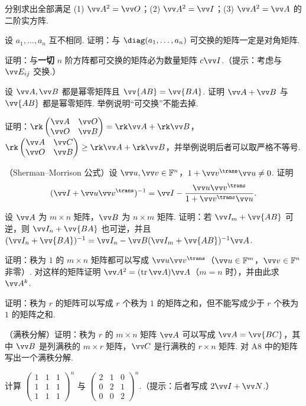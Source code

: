 {		\Bgroup
		\begin{exB}
			\item\label{ex:mat:B1} 分别求出全部满足 (1) $\vv A^2=\vv O$；(2) $\vv A^2=\vv I$；(3) $\vv A^2=\vv A$ 的二阶实方阵.
			\item\label{ex:mat:B2} 设 $a_1,\ldots,a_n$ 互不相同. 证明：与 $\diag(a_1,\ldots,a_n)$ 可交换的矩阵一定是对角矩阵.
			\item\label{ex:mat:B3} 证明：与\textbf{一切} $n$ 阶方阵都可交换的矩阵必为数量矩阵 $c\vv I$.（提示：考虑与 $\vv E_{ij}$ 交换.）
			\item\label{ex:mat:B4} 设 $\vv A,\vv B$ 都是幂零矩阵且 $\vv{AB}=\vv{BA}$. 证明 $\vv A+\vv B$ 与 $\vv{AB}$ 都是幂零矩阵. 举例说明“可交换”不能去掉.
			\item\label{ex:mat:B5} 证明：$\rk\begin{pmatrix}\vv A&\vv O\\ \vv O&\vv B\end{pmatrix}=\rk\vv A+\rk\vv B$，$\rk\begin{pmatrix}\vv A&\vv C\\ \vv O&\vv B\end{pmatrix}\ge\rk\vv A+\rk\vv B$，并举例说明后者可以取严格不等号.
			\item\label{ex:mat:B6} （Sherman–Morrison 公式）设 $\vv u,\vv v\in\mathbb{F}^n$，$1+\vv v^\trans\vv u\ne0$. 证明
			\[(\vv I+\vv u\vv v^\trans)^{-1}=\vv I-\frac{\vv u\vv v^\trans}{1+\vv v^\trans\vv u}.\]
			\item\label{ex:mat:B7} 设 $\vv A$ 为 $m\times n$ 矩阵，$\vv B$ 为 $n\times m$ 矩阵. 证明：若 $\vv I_m+\vv{AB}$ 可逆，则 $\vv I_n+\vv{BA}$ 也可逆，并且 $(\vv I_n+\vv{BA})^{-1}=\vv I_n-\vv B(\vv I_m+\vv{AB})^{-1}\vv A$.
			\item\label{ex:mat:B8} 证明：秩为 $1$ 的 $m\times n$ 矩阵都可以写成 $\vv u\vv v^\trans$（$\vv u\in\mathbb{F}^m$，$\vv v\in\mathbb{F}^n$ 非零）. 对这样的矩阵证明 $\vv A^2=(\tr\vv A)\vv A$（$m=n$ 时），并由此求 $\vv A^k$.
			\item\label{ex:mat:B9} 证明：秩为 $r$ 的矩阵可以写成 $r$ 个秩为 $1$ 的矩阵之和，但不能写成少于 $r$ 个秩为 $1$ 的矩阵之和.
			\item\label{ex:mat:B10} （满秩分解）证明：秩为 $r$ 的 $m\times n$ 矩阵 $\vv A$ 可以写成 $\vv A=\vv{BC}$，其中 $\vv B$ 是列满秩的 $m\times r$ 矩阵，$\vv C$ 是行满秩的 $r\times n$ 矩阵. 对 A8 中的矩阵写出一个满秩分解.
			\item\label{ex:mat:B11} 计算 $\begin{pmatrix}1&1&1\\1&1&1\\1&1&1\end{pmatrix}^n$ 与 $\begin{pmatrix}2&1&0\\0&2&1\\0&0&2\end{pmatrix}^n$.（提示：后者写成 $2\vv I+\vv N$.）

\end{exB}}
